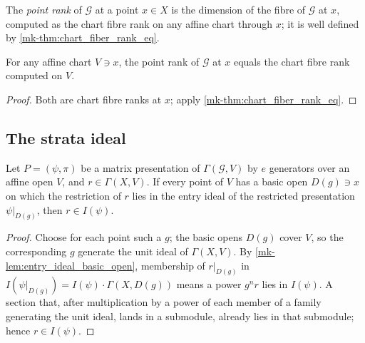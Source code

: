 \begin{definition}
  \label{mk-def:point_rank}
  \leanok

  The \emph{point rank} of \(\mathcal G\) at a point \(x \in X\) is the
  dimension of the fibre of \(\mathcal G\) at \(x\), computed as the chart
  fibre rank on any affine chart through \(x\); it is well defined by
  \ref{mk-thm:chart_fiber_rank_eq}.
\end{definition}

\begin{lemma}
  \label{mk-lem:point_rank_eq_chart_fiber_rank}
  \leanok

  For any affine chart \(V \ni x\), the point rank of \(\mathcal G\) at \(x\)
  equals the chart fibre rank computed on \(V\).
\end{lemma}

\begin{proof}
  \leanok
  Both are chart fibre ranks at \(x\); apply \ref{mk-thm:chart_fiber_rank_eq}.
\end{proof}

\subsection{The strata ideal}

\begin{lemma}
  \label{mk-lem:mem_entry_ideal_locally}
  \leanok

  Let \(P = (\psi, \pi)\) be a matrix presentation of
  \(\Gamma(\mathcal G, V)\) by \(e\) generators over an affine open \(V\), and
  \(r \in \Gamma(X, V)\).  If every point of \(V\) has a basic open
  \(D(g) \ni x\) on which the restriction of \(r\) lies in the entry ideal of
  the restricted presentation \(\psi|_{D(g)}\), then \(r \in I(\psi)\).
\end{lemma}

\begin{proof}
  \leanok
  Choose for each point such a \(g\); the basic opens \(D(g)\) cover \(V\), so
  the corresponding \(g\) generate the unit ideal of \(\Gamma(X, V)\).  By
  \ref{mk-lem:entry_ideal_basic_open}, membership of \(r|_{D(g)}\) in
  \(I(\psi|_{D(g)}) = I(\psi) \cdot \Gamma(X, D(g))\) means a power
  \(g^{n} r\) lies in \(I(\psi)\).  A section that, after multiplication by a
  power of each member of a family generating the unit ideal, lands in a
  submodule, already lies in that submodule; hence \(r \in I(\psi)\).
\end{proof}

